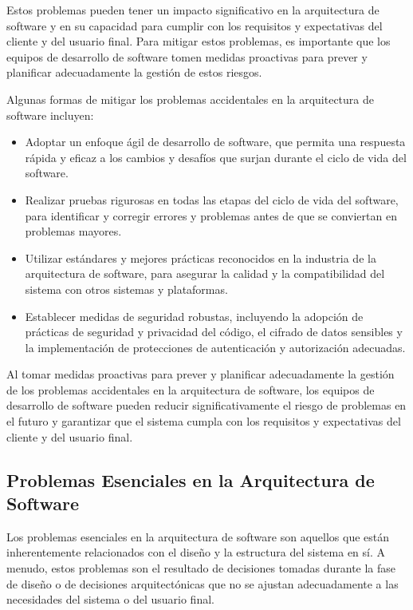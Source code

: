 \documentclass[executivepaper]{article}
\begin{document}
Estos problemas pueden tener un impacto significativo en la arquitectura de software y en su capacidad para cumplir con los requisitos y expectativas del cliente y del usuario final. Para mitigar estos problemas, es importante que los equipos de desarrollo de software tomen medidas proactivas para prever y planificar adecuadamente la gestión de estos riesgos.

Algunas formas de mitigar los problemas accidentales en la arquitectura de software incluyen:

\begin{itemize}
\item Adoptar un enfoque ágil de desarrollo de software, que permita una respuesta rápida y eficaz a los cambios y desafíos que surjan durante el ciclo de vida del software.
\item Realizar pruebas rigurosas en todas las etapas del ciclo de vida del software, para identificar y corregir errores y problemas antes de que se conviertan en problemas mayores.
\item Utilizar estándares y mejores prácticas reconocidos en la industria de la arquitectura de software, para asegurar la calidad y la compatibilidad del sistema con otros sistemas y plataformas.
\item Establecer medidas de seguridad robustas, incluyendo la adopción de prácticas de seguridad y privacidad del código, el cifrado de datos sensibles y la implementación de protecciones de autenticación y autorización adecuadas.
\end{itemize}

Al tomar medidas proactivas para prever y planificar adecuadamente la gestión de los problemas accidentales en la arquitectura de software, los equipos de desarrollo de software pueden reducir significativamente el riesgo de problemas en el futuro y garantizar que el sistema cumpla con los requisitos y expectativas del cliente y del usuario final.

\subsection{Problemas Esenciales en la Arquitectura de Software}

Los problemas esenciales en la arquitectura de software son aquellos que están inherentemente relacionados con el diseño y la estructura del sistema en sí. A menudo, estos problemas son el resultado de decisiones tomadas durante la fase de diseño o de decisiones arquitectónicas que no se ajustan adecuadamente a las necesidades del sistema o del usuario final.
\end{document}
